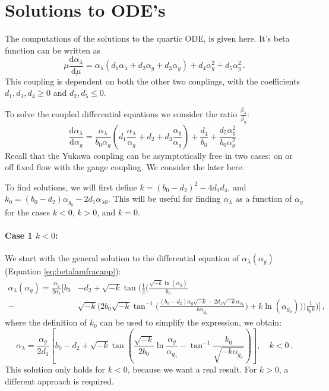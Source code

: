 
\section{Solutions to ODE's}\label{app:caf}

The computations of the solutions to the quartic ODE, is given here. It's beta function can be written as
\begin{equation}
    \mu \frac{\text{d} \alpha_\lambda}{\text{d}\mu}=\alpha_\lambda\left(d_1\alpha_\lambda + d_2\alpha_g+d_3\alpha_y\right)+d_4\alpha_g^2+d_5\alpha_y^2\,.
\end{equation}
This coupling is dependent on both the other two couplings, with the coefficients $d_1,d_3,d_4\ge0$ and $d_2,d_5\le 0$.

To solve the coupled differential equations we consider the ratio $\frac{\beta_\lambda}{\beta_g}$:
\begin{equation}
    \frac{\text{d} \alpha_\lambda}{\text{d}\alpha_g}=\frac{\alpha_\lambda}{b_0\alpha_g}\left(d_1\frac{\alpha_\lambda}{\alpha_g} + d_2+d_3\frac{\alpha_y}{\alpha_g}\right)+\frac{d_4}{b_0}+\frac{d_5\alpha_y^2}{b_0\alpha_g^2}\,.\label{eq:appodelam}
\end{equation}
Recall that the Yukawa coupling can be asymptotically free in two cases: on or off fixed flow with the gauge coupling. We consider the later here. 

To find solutions, we will first define $k = (b_0 - d_2)^2 - 4d_1 d_4$, and $k_0 = (b_0 - d_2)\alpha_{g_0} - 2d_1\alpha_{\lambda0}$.
This will be useful for finding $\alpha_\lambda$ as a function of $\alpha_g$ for the cases $k<0$, $k>0$, and $k=0$. 

\paragraph{Case 1 $k < 0$:}
We start with the general solution to the differential equation of $\alpha_\lambda(\alpha_g)$ (Equation \ref{eq:betalamfracapp}):
\begin{align}
    \alpha_{\lambda} (\alpha_{g}) = \frac{\alpha_{g}}{2\alpha_{1}}\Bigg[ b_0& - d_2 + 
    \sqrt{-k} \tan \bigg( \frac{1}{2} \bigg( \frac{\sqrt{-k} \ln (\alpha_{g})}{b_0} 
    \\-&\sqrt{-k} \bigg( 2b_0 \sqrt{-k} \tan^{-1} \bigg( \frac{(b_0 - d_2) \alpha_{g} \sqrt{-k} - 2d_1 \sqrt{-k} \alpha_{\lambda_0}}{k \alpha_{g_0}} \bigg) + k \ln (\alpha_{g_0}) 
    \bigg)\bigg) \frac{1}{b_0 k} \bigg) \Bigg]\,,\nonumber
\end{align}
where the definition of $k_0$ can be used to simplify the expression, we obtain:
\begin{equation}
    \boxed{\alpha_{\lambda} = \frac{\alpha_{g}}{2d_{1}} \left[ b_0 - d_2 + \sqrt{-k} \tan\left( \frac{\sqrt{-k}}{2b_0} \ln\frac{\alpha_g}{\alpha_{g_0}} - \tan^{-1}\frac{k_0}{\sqrt{-k\alpha_{g_0}}} \right) \right] , \quad k<0 \,.}
    \label{eq:appalphalamkl0}
\end{equation}
This solution only holds for \( k < 0 \), because we want a real result. For \( k > 0 \), a different approach is required. 

